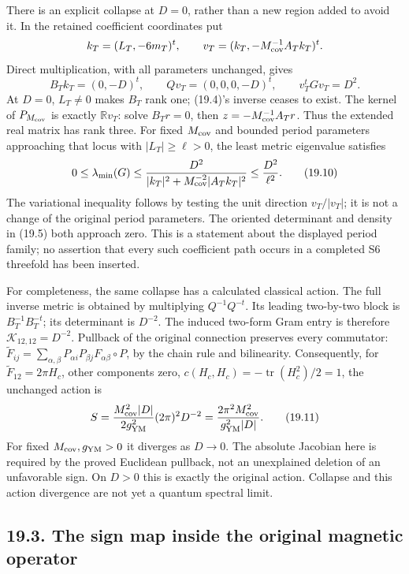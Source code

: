 \documentclass[
]{article}
\begin{document}
There is an explicit collapse at \(D=0\), rather than a new region added
to avoid it. In the retained coefficient coordinates put \[
k_T=(L_T,-6m_T)^t,\qquad
v_T=(k_T,-M_{\rm cov}^{-1}A_Tk_T)^t.
\] Direct multiplication, with all parameters unchanged, gives \[
B_Tk_T=(0,-D)^t,\qquad
Qv_T=(0,0,0,-D)^t,\qquad
v_T^tGv_T=D^2.
                                                               \tag{19.9}
\] At \(D=0\), \(L_T\ne0\) makes \(B_T\) rank one; (19.4)'s inverse
ceases to exist. The kernel of \(P_{M_{\rm cov}}\) is exactly
\(\mathbb R v_T\): solve \(B_Tr=0\), then \(z=-M_{\rm cov}^{-1}A_Tr\).
Thus the extended real matrix has rank three. For fixed \(M_{\rm cov}\)
and bounded period parameters approaching that locus with
\(|L_T|\ge \ell>0\), the least metric eigenvalue satisfies \[
0\le\lambda_{\min}(G)\le
\frac{D^2}{\lvert k_T\rvert^2+
 M_{\rm cov}^{-2}\lvert A_Tk_T\rvert^2}\le\frac{D^2}{\ell^2}.
                                                               \tag{19.10}
\] The variational inequality follows by testing the unit direction
\(v_T/|v_T|\); it is not a change of the original period parameters. The
oriented determinant and density in (19.5) both approach zero. This is a
statement about the displayed period family; no assertion that every
such coefficient path occurs in a completed S6 threefold has been
inserted.

For completeness, the same collapse has a calculated classical action.
The full inverse metric is obtained by multiplying \(Q^{-1}Q^{-t}\). Its
leading two-by-two block is \(B_T^{-1}B_T^{-t}\); its determinant is
\(D^{-2}\). The induced two-form Gram entry is therefore
\(\mathcal K_{12,12}=D^{-2}\). Pullback of the original connection
preserves every commutator:
\(\widetilde F_{ij}=\sum_{\alpha,\beta}P_{\alpha i}P_{\beta j}
F_{\alpha\beta}\circ P\), by the chain rule and bilinearity.
Consequently, for \(\widetilde F_{12}=2\pi H_c\), other components zero,
\(c(H_c,H_c)=-\operatorname{tr}(H_c^2)/2=1\), the unchanged action is \[
S=\frac{M_{\rm cov}^2|D|}{2g_{\rm YM}^2}
 (2\pi)^2D^{-2}
 =\frac{2\pi^2M_{\rm cov}^2}{g_{\rm YM}^2|D|}.
                                                               \tag{19.11}
\] For fixed \(M_{\rm cov},g_{\rm YM}>0\) it diverges as \(D\to0\). The
absolute Jacobian here is required by the proved Euclidean pullback, not
an unexplained deletion of an unfavorable sign. On \(D>0\) this is
exactly the original action. Collapse and this action divergence are not
yet a quantum spectral limit.

\subsection{19.3. The sign map inside the original magnetic
operator}\label{the-sign-map-inside-the-original-magnetic-operator}
\end{document}
